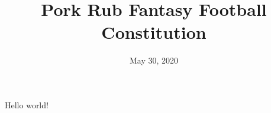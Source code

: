 \documentclass{article}
\title{Pork Rub Fantasy Football Constitution}
\date{May 30, 2020}
\begin{document}
	\maketitle
	Hello world!
\end{document}
